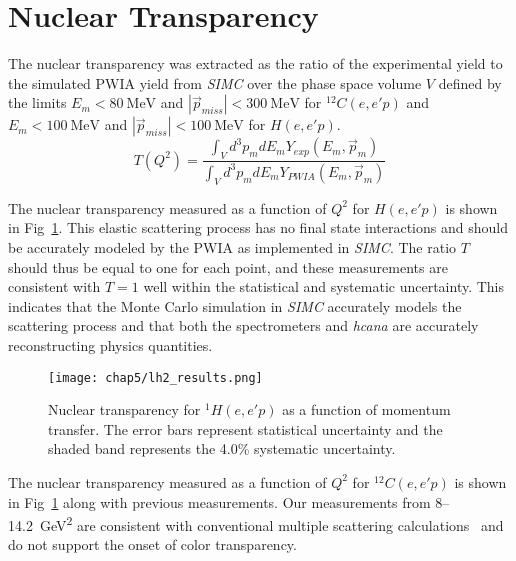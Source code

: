 \section{Nuclear Transparency}

The nuclear transparency was extracted as the ratio of the experimental yield
to the simulated PWIA yield from \textit{SIMC} over the phase space volume $V$
defined by the limits
$E_m<\SI{80}{\mega\electronvolt}$ and
$|\vec{p}_{miss}|<\SI{300}{\mega\electronvolt}$ for ${}^{12}C(e,e'p)$
and
$E_m<\SI{100}{\mega\electronvolt}$ and
$|\vec{p}_{miss}|<\SI{100}{\mega\electronvolt}$ for $H(e,e'p)$.
\begin{equation}
    T(Q^2) = \frac{\int_{V} d^{3} p_{m} d E_{m} Y_{exp }(E_{m}, \vec{p}_{m})}
                  {\int_{V} d^{3} p_{m} d E_{m} Y_{PWIA}(E_{m}, \vec{p}_{m})}
\end{equation}

The nuclear transparency measured as a function of $Q^2$ for $H(e,e'p)$ is
shown in Fig~\ref{fig:lh2_transparency_results}.
This elastic scattering process has no final state interactions and should be
accurately modeled by the PWIA as implemented in \textit{SIMC}.
The ratio $T$ should thus be equal to one for each point, and these
measurements are consistent with $T=1$ well within the statistical and
systematic uncertainty.
This indicates that the Monte Carlo simulation in \textit{SIMC} accurately
models the scattering process and that both the spectrometers and
\textit{hcana} are accurately reconstructing physics quantities.

\begin{figure}[!h]
    \centering
    \texttt{[image: chap5/lh2\_results.png]}
    \caption[Nuclear transparency for ${}^{1}H(e,e'p)$ as a function of
            momentum transfer.]{
            Nuclear transparency for ${}^{1}H(e,e'p)$ as a function of
            momentum transfer.
            The error bars represent statistical uncertainty and the
            shaded band represents the 4.0\% systematic uncertainty.
            }
    \label{fig:lh2_transparency_results}
\end{figure}

The nuclear transparency measured as a function of $Q^2$ for ${}^{12}C(e,e'p)$
is shown in Fig~\ref{fig:lh2_transparency_results} along with previous
measurements.
Our measurements from 8--\SI{14.2}{\giga\electronvolt\squared} are consistent
with conventional multiple scattering calculations~\cite{Pandharipande_1992}
and do not support the onset of color transparency.

